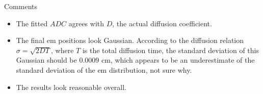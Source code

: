 \documentclass[dvipsnames]{beamer}
\begin{document}
\begin{frame}{Comments}
\begin{itemize}
\item The fitted $ADC$ agrees with $D$, the actual diffusion coefficient.
\item The final em positions look Gaussian. According to the diffusion relation $\sigma = \sqrt{2DT}$, where $T$ is the total diffusion time, the standard deviation of this Gaussian should be $0.0009$ cm, which appears to be an underestimate of the standard deviation of the em distribution, not sure why.
\item The results look reasonable overall.
\end{itemize}
\end{frame}
\end{document}
